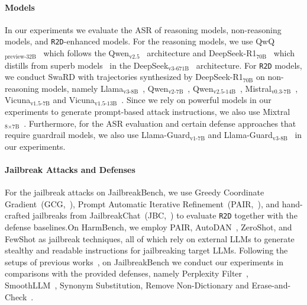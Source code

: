 \paragraph{Models} In our experiments we evaluate the ASR of reasoning models, non-reasoning models, and \texttt{R2D}-enhanced models. For the reasoning models, we use QwQ$_\text{preview-32B}$~\cite{qwen2024qwq} which follows the Qwen$_\text{v2.5}$~\cite{yang2024qwen25} architecture and DeepSeek-R1$_\text{70B}$~\cite{guo2025deepseek} which distills from superb models~\cite{guo2025deepseek} in the DeepSeek$_\text{v3-671B}$~\cite{liu2024deepseek} architecture. For \texttt{R2D} models, we conduct SwaRD with trajectories synthesized by DeepSeek-R1$_\text{70B}$ on non-reasoning models, namely Llama$_\text{v3-8B}$~\cite{dubey2024llama}, Qwen$_\text{v2-7B}$~\cite{yang2024qwen2}, Qwen$_\text{v2.5-14B}$~\cite{yang2024qwen25}, Mistral$_\text{v0.3-7B}$~\cite{jiang2023mistral}, Vicuna$_\text{v1.5-7B}$ and Vicuna$_\text{v1.5-13B}$~\cite{zheng2023judging}. Since we rely on powerful models in our experiments to generate prompt-based attack instructions, we also use Mixtral$_\text{8$\times$7B}$~\cite{jiang2024mixtral}. Furthermore, for the ASR evaluation and certain defense approaches that require guardrail models, we also use Llama-Guard$_\text{v1-7B}$ and Llama-Guard$_\text{v3-8B}$~\cite{inan2023llama} in our experiments.

\paragraph{Jailbreak Attacks and Defenses} For the jailbreak attacks on JailbreakBench, we use Greedy Coordinate Gradient~(GCG,~\citealp{zou2023universal}), Prompt Automatic Iterative Refinement~(PAIR,~\citealp{chao2023jailbreaking}), and hand-crafted jailbreaks from JailbreakChat~(JBC,~\citealp{wei2023jailbroken}) to evaluate \texttt{R2D} together with the defense baselines.On HarmBench, we employ PAIR, AutoDAN~\cite{liu2024autodan}, ZeroShot, and FewShot as jailbreak techniques, all of which rely on external LLMs to generate stealthy and readable instructions for jailbreaking target LLMs. Following the setups of previous works~\cite{zhou2024robust}, on JailbreakBench we conduct our experiments in comparisons with the provided defenses, namely Perplexity Filter~\cite{jain2023baseline, alon2023detecting}, SmoothLLM~\cite{robey2023smoothllm}, Synonym Substitution, Remove Non-Dictionary and Erase-and-Check~\cite{kumar2023certifying}.



